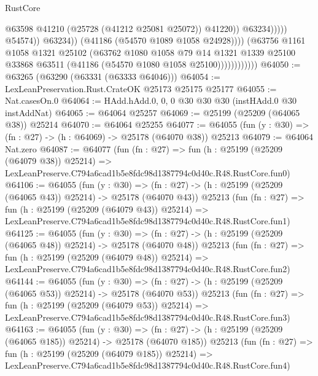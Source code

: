 \begin{lexlean}{RustCore}
\begin{coremodule}
                                              @63598
                                              @41210
                                              (@25728 (@41212 @25081 @25072))
                                              @41220))
                                          @63234)))))
                                @54574))
                            @63234))
                        (@41186 (@54570 @1089 @1058 @24928))))
                    (@63756
                      @1161
                      @1058
                      @1321
                      @25102
                      (@63762
                        @1080
                        @1058
                        @79
                        @14
                        @1321
                        @1339
                        @25100
                        @33868
                        @63511
                        (@41186 (@54570 @1080 @1058 @25100))))))))))))
@64050 := @63265 (@63290 (@63331 (@63333 @64046)))
@64054 := LexLeanPreservation.Rust.CrateOK @25173 @25175 @25177
@64055 := Nat.casesOn.{0}
@64064 := HAdd.hAdd.{0, 0, 0} @30 @30 @30 (instHAdd.{0} @30 instAddNat)
@64065 := @64064 @25257
@64069 := @25199 (@25209 (@64065 @38)) @25214
@64070 := @64064 @25255
@64077 := @64055 (fun (y : @30) => (fn : @27) -> (h : @64069) -> @25178 (@64070 @38)) @25213
@64079 := @64064 Nat.zero
@64087 := @64077
    (fun (fn : @27) =>
    fun (h : @25199 (@25209 (@64079 @38)) @25214) =>
    LexLeanPreserve.C794a6cad1b5e8fdc98d1387794c0d40c.R48.RustCore.fun0)
@64106 := @64055
    (fun (y : @30) =>
    (fn : @27) -> (h : @25199 (@25209 (@64065 @43)) @25214) -> @25178 (@64070 @43))
    @25213
    (fun (fn : @27) =>
    fun (h : @25199 (@25209 (@64079 @43)) @25214) =>
    LexLeanPreserve.C794a6cad1b5e8fdc98d1387794c0d40c.R48.RustCore.fun1)
@64125 := @64055
    (fun (y : @30) =>
    (fn : @27) -> (h : @25199 (@25209 (@64065 @48)) @25214) -> @25178 (@64070 @48))
    @25213
    (fun (fn : @27) =>
    fun (h : @25199 (@25209 (@64079 @48)) @25214) =>
    LexLeanPreserve.C794a6cad1b5e8fdc98d1387794c0d40c.R48.RustCore.fun2)
@64144 := @64055
    (fun (y : @30) =>
    (fn : @27) -> (h : @25199 (@25209 (@64065 @53)) @25214) -> @25178 (@64070 @53))
    @25213
    (fun (fn : @27) =>
    fun (h : @25199 (@25209 (@64079 @53)) @25214) =>
    LexLeanPreserve.C794a6cad1b5e8fdc98d1387794c0d40c.R48.RustCore.fun3)
@64163 := @64055
    (fun (y : @30) =>
    (fn : @27) -> (h : @25199 (@25209 (@64065 @185)) @25214) -> @25178 (@64070 @185))
    @25213
    (fun (fn : @27) =>
    fun (h : @25199 (@25209 (@64079 @185)) @25214) =>
    LexLeanPreserve.C794a6cad1b5e8fdc98d1387794c0d40c.R48.RustCore.fun4)

\end{coremodule}
\end{lexlean}
